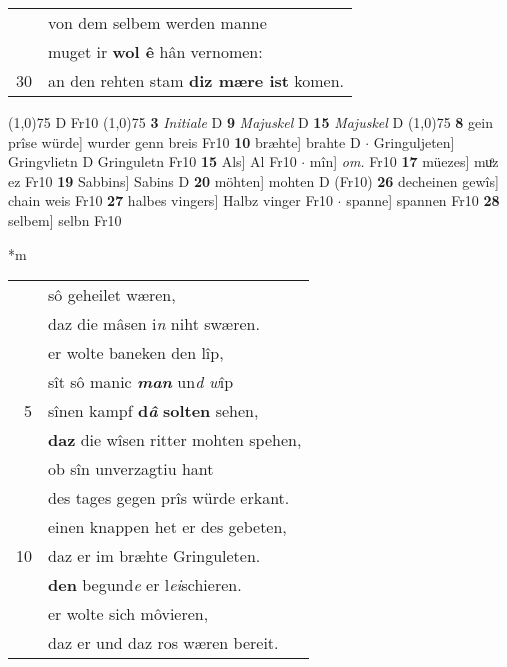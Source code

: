 \documentclass[8pt,a4paper,notitlepage]{article}
\begin{document}
\begin{table}[ht]
\begin{minipage}[t]{0.5\linewidth}
\begin{tabular}{rl}
 & von dem selbem werden manne\\ 
 & muget ir \textbf{wol ê} hân vernomen:\\ 
30 & an den rehten stam \textbf{diz mære ist} komen.\\ 
\end{tabular}
\scriptsize
\line(1,0){75} \newline
D Fr10 \newline
\line(1,0){75} \newline
\textbf{3} \textit{Initiale} D  \textbf{9} \textit{Majuskel} D  \textbf{15} \textit{Majuskel} D  \newline
\line(1,0){75} \newline
\textbf{8} gein prîse würde] wurder genn breis Fr10 \textbf{10} bræhte] brahte D  $\cdot$ Gringuljeten] Gringvlietn D Gringuletn Fr10 \textbf{15} Als] Al Fr10  $\cdot$ mîn] \textit{om.} Fr10 \textbf{17} müezes] muͦz ez Fr10 \textbf{19} Sabbins] Sabins D \textbf{20} möhten] mohten D (Fr10) \textbf{26} decheinen gewîs] chain weis Fr10 \textbf{27} halbes vingers] Halbz vinger Fr10  $\cdot$ spanne] spannen Fr10 \textbf{28} selbem] selbn Fr10 \newline
\end{minipage}
\hspace{0.5cm}
\begin{minipage}[t]{0.5\linewidth}
\small
\begin{center}*m
\end{center}
\begin{tabular}{rl}
 & sô geheilet wæren,\\ 
 & daz die mâsen i\textit{n} niht swæren.\\ 
 & er wolte baneken den lîp,\\ 
 & sît sô manic \textit{\textbf{man}} un\textit{d w}îp\\ 
5 & sînen kampf \textbf{d\textit{â}} \textbf{solten} sehen,\\ 
 & \textbf{daz} die wîsen ritter mohten spehen,\\ 
 & ob sîn unverzagtiu hant\\ 
 & des tages gegen prîs würde erkant.\\ 
 & einen knappen het er des gebeten,\\ 
10 & daz er im bræhte Gringuleten.\\ 
 & \textbf{den} begund\textit{e} er l\textit{ei}schieren.\\ 
 & er wolte sich môvieren,\\ 
 & daz er und daz ros wæren bereit.\\ 

\end{tabular}
\end{minipage}
\end{table}
\end{document}
